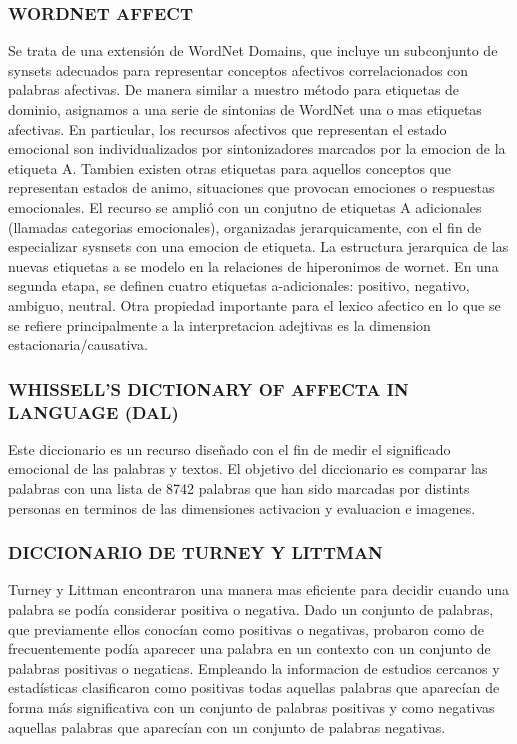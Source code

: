 \subsubsection{WORDNET AFFECT}

	Se trata de una extensión de WordNet Domains, que incluye un subconjunto de synsets adecuados para representar conceptos afectivos correlacionados con palabras afectivas. De manera similar a nuestro método para etiquetas de dominio, asignamos a una serie de sintonias de WordNet una o mas etiquetas afectivas. En particular, los recursos afectivos que representan el estado emocional son individualizados por sintonizadores marcados por la emocion de la etiqueta A. Tambien existen otras etiquetas para aquellos conceptos que representan estados de animo, situaciones que provocan emociones o respuestas emocionales.
	El recurso se amplió con un conjutno de etiquetas A adicionales (llamadas categorias emocionales), organizadas jerarquicamente, con el fin de especializar sysnsets con una emocion de etiqueta. 
La estructura jerarquica de las nuevas etiquetas a se modelo en la relaciones de hiperonimos de wornet. En una segunda etapa, se definen cuatro etiquetas a-adicionales: positivo, negativo, ambiguo, neutral.
	Otra propiedad importante para el lexico afectico en lo que se se refiere principalmente a la interpretacion adejtivas es la dimension estacionaria/causativa.

	\subsubsection{WHISSELL'S DICTIONARY OF AFFECTA IN LANGUAGE (DAL)}
	
	Este diccionario es un recurso diseñado con el fin de medir el significado emocional de las palabras y textos. El objetivo del diccionario es comparar las palabras con una lista de 8742 palabras que han sido marcadas por distints personas en terminos de las dimensiones activacion y evaluacion e imagenes.

	\subsubsection{DICCIONARIO DE TURNEY Y LITTMAN}
	
	Turney y Littman encontraron una manera mas eficiente para decidir cuando una palabra se podía considerar positiva o negativa. Dado un conjunto de palabras, que previamente ellos conocían como positivas o negativas, probaron como de frecuentemente podía aparecer una palabra en un contexto con un conjunto de palabras positivas o negaticas. 
Empleando la informacion de estudios cercanos y estadísticas clasificaron como positivas todas aquellas palabras que aparecían de forma más significativa con un conjunto de palabras positivas y como negativas aquellas palabras que aparecían con un conjunto de palabras negativas.

